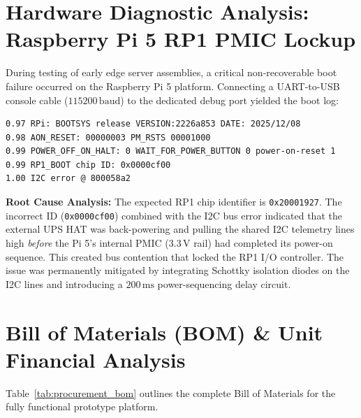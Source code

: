 \section{Hardware Diagnostic Analysis: Raspberry Pi 5 RP1 PMIC Lockup}
During testing of early edge server assemblies, a critical non-recoverable boot failure occurred on the Raspberry Pi 5 platform. Connecting a UART-to-USB console cable ($115200\,\text{baud}$) to the dedicated debug port yielded the boot log:
\begin{lstlisting}[language=bash]
0.97 RPi: BOOTSYS release VERSION:2226a853 DATE: 2025/12/08
0.98 AON_RESET: 00000003 PM_RSTS 00001000
0.99 POWER_OFF_ON_HALT: 0 WAIT_FOR_POWER_BUTTON 0 power-on-reset 1
0.99 RP1_BOOT chip ID: 0x0000cf00
1.00 I2C error @ 800058a2
\end{lstlisting}

\textbf{Root Cause Analysis:} The expected RP1 chip identifier is \texttt{0x20001927}. The incorrect ID (\texttt{0x0000cf00}) combined with the I2C bus error indicated that the external UPS HAT was back-powering and pulling the shared I2C telemetry lines high \textit{before} the Pi 5's internal PMIC ($3.3\,\text{V}$ rail) had completed its power-on sequence. This created bus contention that locked the RP1 I/O controller. The issue was permanently mitigated by integrating Schottky isolation diodes on the I2C lines and introducing a $200\,\text{ms}$ power-sequencing delay circuit.

\section{Bill of Materials (BOM) \& Unit Financial Analysis}
Table~\ref{tab:procurement_bom} outlines the complete Bill of Materials for the fully functional prototype platform.

